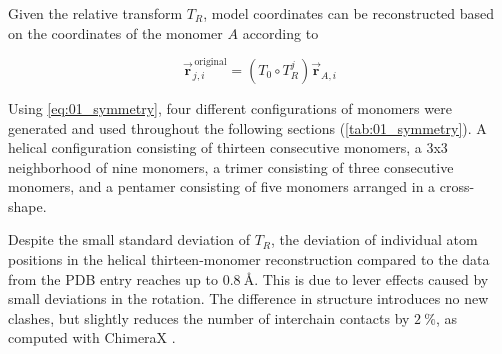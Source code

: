 Given the relative transform $T_R$, model coordinates can be reconstructed based on the coordinates of the monomer $A$ according to 

\begin{equation}\label{eq:01_symmetry}
\vec{\mathbf{r}}_{j,i}^{\,\text{original}} = (T_0 \circ T_R^j) \vec{\mathbf{r}}_{A,i}
\end{equation}

Using \autoref{eq:01_symmetry}, four different configurations of monomers were generated and used throughout the following sections (\autoref{tab:01_symmetry}). A helical configuration consisting of thirteen consecutive monomers, a 3x3 neighborhood of nine monomers, a trimer consisting of three consecutive monomers, and a pentamer consisting of five monomers arranged in a cross-shape. 

Despite the small standard deviation of $T_R$, the deviation of individual atom positions in the helical thirteen-monomer reconstruction compared to the data from the PDB entry reaches up to $\SI{0.8}{\angstrom}$. This is due to lever effects caused by small deviations in the rotation. The difference in structure introduces no new clashes, but slightly reduces the number of interchain contacts by $\SI{2}{\percent}$, as computed with ChimeraX \cite{ChimeraX2023}.